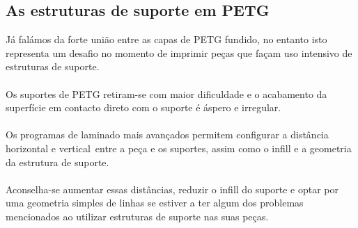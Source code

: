 \documentclass[11pt,a4paper]{article}
\begin{document}
	\subsection{As estruturas de suporte em PETG}Já falámos da forte união entre as capas de PETG fundido, no entanto isto representa um desafio no momento de imprimir peças que façam uso intensivo de estruturas de suporte.
\\\\
Os suportes de PETG retiram-se com maior dificuldade e o acabamento da superfície em contacto direto com o suporte é áspero e irregular.
\\\\
Os programas de laminado mais avançados permitem configurar a distância horizontal e vertical entre a peça e os suportes, assim como o infill e a geometria da estrutura de suporte.
\\\\
Aconselha-se aumentar essas distâncias, reduzir o infill do suporte e optar por uma geometria simples de linhas se estiver a ter algum dos problemas mencionados ao utilizar estruturas de suporte nas suas peças.
\end{document}

